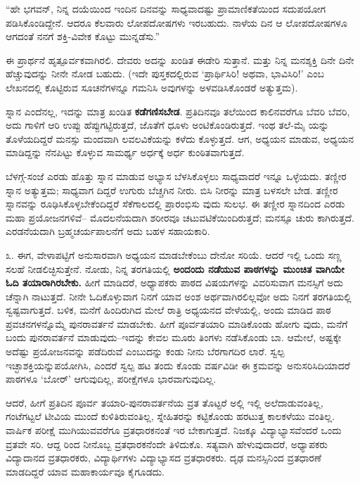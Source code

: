 “ಹೇ ಭಗವನ್, ನಿನ್ನ ದಯೆಯಿಂದ ಇಂದಿನ ದಿನವನ್ನು ಸಾಧ್ಯವಾದಷ್ಟು ಪ್ರಾಮಾಣಿಕತೆಯಿಂದ ಸದುಪಯೋಗ ಪಡಿಸಿಕೊಂಡಿದ್ದೇನೆ. ಆದರೂ ಕೆಲವಾರು ಲೋಪದೋಷಗಳು ಇರಬಹುದು. ನಾಳೆಯ ದಿನ ಆ ಲೋಪದೋಷಗಳೂ ಆಗದಂತೆ ನನಗೆ ಶಕ್ತಿ-ವಿವೇಕ ಕೊಟ್ಟು ಮುನ್ನಡೆಸು.”

ಈ ಪ್ರಾರ್ಥನೆ ಹೃತ್ಪೂರ್ವಕವಾಗಿರಲಿ. ದೇವರು ಅದನ್ನು ಖಂಡಿತ ಈಡೇರಿ ಸುತ್ತಾನೆ. ಮತ್ತು ನಿನ್ನ ಮನಶ್ಶಕ್ತಿ ದಿನೇ ದಿನೇ ಹೆಚ್ಚುವುದನ್ನು ನೀನೇ ನೋಡ ಬಹುದು. (ಇದೇ ಪುಸ್ತಕದಲ್ಲಿರುವ ‘ಪ್ರಾರ್ಥಿಸಿರಿ! ಅಥವಾ, ಭಾವಿಸಿರಿ!’ ಎಂಬ ಲೇಖನದಲ್ಲಿ ಕೊಟ್ಟಿರುವ ಸೂಚನೆಗಳನ್ನೂ ಗಮನಿಸಿ ಅವುಗಳನ್ನು ಅಳವಡಿಸಿಕೊಂಡರೆ ಅತ್ಯುತ್ತಮ).

ಸ್ನಾನ ಎಂದೆನಲ್ಲ, ಇದನ್ನು ಮಾತ್ರ ಖಂಡಿತ \textbf{ಕಡೆಗಣಿಸಬೇಡ}. ಪ್ರತಿದಿನವೂ ತಲೆಯಿಂದ ಕಾಲಿನವರೆಗೂ ಬೆವರಿ ಬೆವರಿ, ಅದು ಗಾಳಿಗೆ ಆರಿ ಉಪ್ಪು ಹೆಪ್ಪುಗಟ್ಟಿರುತ್ತದೆ, ಜೊತೆಗೆ ಧೂಳು ಅಂಟಿಕೊಂಡಿರುತ್ತದೆ. ಇಂಥ ತಲೆ-ಮೈ ಯನ್ನು ತೊಳೆಯದಿದ್ದರೆ ಮನಸ್ಸು ಮಂದವಾಗಿ ಲವಲವಿಕೆಯನ್ನು ಕಳೆದು ಕೊಳ್ಳುತ್ತದೆ. ಆಗ, ಅಧ್ಯಯನ ಮಾಡುವ, ಅಧ್ಯಯನ ಮಾಡಿದ್ದನ್ನು ನೆನಪಿಟ್ಟು ಕೊಳ್ಳುವ ಸಾಮರ್ಥ್ಯ ಅರ್ಧಕ್ಕೆ ಅರ್ಧ ಕುಂಠಿತವಾಗುತ್ತದೆ.

ಬೆಳಗ್ಗೆ-ಸಂಜೆ ಎರಡು ಹೊತ್ತು ಸ್ನಾನ ಮಾಡುವ ಅಭ್ಯಾಸ ಬೆಳಸಿಕೊಳ್ಳಲು ಸಾಧ್ಯವಾದರೆ ಇನ್ನೂ ಒಳ್ಳೆಯದು. ತಣ್ಣೀರ ಸ್ನಾನ ಅತ್ಯುತ್ತಮ; ಸಾಧ್ಯವಾಗ ದಿದ್ದರೆ ಉಗುರು ಬೆಚ್ಚಗಿನ ನೀರು. ಬಿಸಿ ನೀರನ್ನು ಮಾತ್ರ ಬಳಸಲೇ ಬೇಡ. ತಣ್ಣೀರ ಸ್ನಾನವನ್ನು ರೂಢಿಸಿಕೊಳ್ಳಬೇಕೆಂದಿದ್ದರೆ ಸೆಕೆಗಾಲದಲ್ಲಿ ಪ್ರಾರಂಭಿಸು ವುದು ಸುಲಭ. ಈ ತಣ್ಣೀರ ಸ್ನಾನದಿಂದ ಎರಡು ಮಹಾ ಪ್ರಯೋಜನಗಳಿವೆ– ಮೊದಲನೆಯದಾಗಿ ಶರೀರವೂ ಚಟುವಟಿಕೆಯಿಂದಿರುತ್ತದೆ; ಮನಸ್ಸೂ ಚುರು ಕಾಗಿರುತ್ತದೆ. ಎರಡನೆಯದಾಗಿ ಬ್ರಹ್ಮಚರ್ಯಪಾಲನೆಗೆ ಅದು ಬಹಳ ಸಹಾಯಕಾರಿ.

೩. ಈಗ, ವೇಳಾಪಟ್ಟಿಗೆ ಅನುಸಾರವಾಗಿ ಅಧ್ಯಯನ ಮಾಡಬೇಕೆಂಬು ದೇನೋ ಸರಿಯೆ. ಆದರೆ ಇಲ್ಲಿ ಒಂದು ಸಣ್ಣ ಸಲಹೆ ನೀಡಲಿಚ್ಛಿಸುತ್ತೇನೆ. ನೋಡು, ನಿನ್ನ ತರಗತಿಯಲ್ಲಿ \textbf{ಅಂದಂದು ನಡೆಯುವ ಪಾಠಗಳನ್ನು ಮುಂಚಿತ ವಾಗಿಯೇ ಓದಿ ತಯಾರಾಗಿರಬೇಕು.} ಹೀಗೆ ಮಾಡಿದರೆ, ಅಧ್ಯಾಪಕರು ಪಾಠದ ವಿಷಯಗಳನ್ನು ವಿವರಿಸುವಾಗ ಮನಸ್ಸಿಗೆ ಅದು ಚೆನ್ನಾಗಿ ನಾಟುತ್ತದೆ. ನೀನೇ ಓದಿಕೊಳ್ಳುವಾಗ ನಿನಗೆ ಯಾವ ಅಂಶ ಅರ್ಥವಾಗಿರಲಿಲ್ಲವೋ ಅದು ನಿನಗೆ ತರಗತಿಯಲ್ಲಿ ಸ್ವಷ್ಟವಾಗುತ್ತದೆ. ಬಳಿಕ, ಮನೆಗೆ ಹಿಂದಿರುಗಿದ ಮೇಲೆ ರಾತ್ರಿ ಅಧ್ಯಯನದ ವೇಳೆಯಲ್ಲಿ, ಅಂದು ಮಾಡಿದ ಪಾಠ ಪ್ರವಚನಗಳನ್ನೊಮ್ಮೆ ಪುನರಾವರ್ತನೆ ಮಾಡಬೇಕು. ಹೀಗೆ ಪೂರ್ವತಯಾರಿ ಮಾಡಿಕೊಂಡು ಹೋಗು ವುದು, ಮನೆಗೆ ಬಂದು ಪುನರಾವರ್ತನೆ ಮಾಡುವುದು–ಇದನ್ನು ಕೇವಲ ಮೂರು ತಿಂಗಳು ನಡೆಸಿಕೊಂಡು ಬಾ. ಆಮೇಲೆ, ಅಷ್ಟಕ್ಕೇ ಅದೆಷ್ಟು ಪ್ರಯೋಜನವನ್ನು ಪಡೆದಿರುವೆ ಎಂಬುದನ್ನು ಕಂಡು ನೀನು ಬೆರಗಾಗದಿರ ಲಾರೆ. ಸ್ವಲ್ಪ ಇಚ್ಛಾಶಕ್ತಿಯನ್ನುಪಯೋಗಿಸಿ, ಎಂದರೆ ಸ್ವಲ್ಪ ಹಟ ತಂದು ಕೊಂಡು ವರ್ಷವಿಡೀ ಈ ಕ್ರಮವನ್ನು ಅನುಸರಿಸಿದಿಯಾದರೆ ಪಾಠಗಳೂ ‘ಬೋರ್​’ ಆಗುವುದಿಲ್ಲ, ಪರೀಕ್ಷೆಗಳೂ ಭಾರವಾಗುವುದಿಲ್ಲ.

ಆದರೆ, ಹೀಗೆ ಪ್ರತಿದಿನ ಪೂರ್ವ ತಯಾರಿ-ಪುನರಾವರ್ತನೆಯ ವ್ರತ ತೊಟ್ಟರೆ ಅಲ್ಲಿ ಇಲ್ಲಿ ಅಲೆದಾಡುವಂತಿಲ್ಲ, ಗಂಟೆಗಟ್ಟಲೆ ಟೀವಿಯ ಮುಂದೆ ಕುಳಿತಿರುವಂತಿಲ್ಲ, ಸ್ನೇಹಿತರನ್ನು ಕಟ್ಟಿಕೊಂಡು ಹರಟುತ್ತ ಕಾಲಕಳೆಯು ವಂತಿಲ್ಲ. ವಾರ್ಷಿಕ ಪರೀಕ್ಷೆ ಮುಗಿಯುವವರೆಗೂ ವ್ರತಧಾರಕನಂತೆ ಇರ ಬೇಕಾಗುತ್ತದೆ. ನಿಜಕ್ಕೂ ವಿದ್ಯಾಭ್ಯಾಸವೆಂದರೆ ಒಂದು ವ್ರತವೇ ಸರಿ. ಆದ್ದ ರಿಂದ ನೀನೊಬ್ಬ ವ್ರತಧಾರಕನೆಂದೇ ತಿಳಿದುಕೊ. ಸತ್ಯವಾಗಿ ಹೇಳುವುದಾದರೆ, ಅಧ್ಯಾಪಕರು ವಿದ್ಯಾದಾನದ ವ್ರತಧಾರಕರು, ವಿದ್ಯಾರ್ಥಿಗಳು ವಿದ್ಯಾಭ್ಯಾಸದ ವ್ರತಧಾರಕರು. ದೃಢ ಮನಸ್ಸಿನಿಂದ ವ್ರತಧಾರಣೆ ಮಾಡದಿದ್ದರೆ ಯಾವ ಮಹಾಕಾರ್ಯವೂ ಕೈಗೂಡದು.

